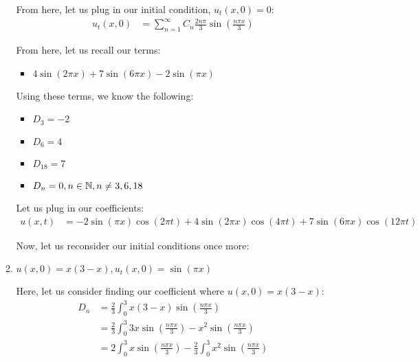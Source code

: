 \documentclass{article}
\begin{document}
\begin{enumerate}
\begin{enumerate}
     From here, let us plug in our initial condition, $u_t(x, 0) = 0$:
     \begin{align}
       u_t(x, 0) & =
       \sum^\infty_{n = 1}
       C_n
       \frac{2 n \pi}{3} \sin \left( \frac{n \pi x}{3} \right)
     \end{align}

     From here, let us recall our terms:
     \begin{itemize}
       \item $4 \sin(2 \pi x) + 7 \sin(6 \pi x) - 2\sin(\pi x)$
     \end{itemize}

     Using these terms, we know the following:
     \begin{itemize}
       \item $D_3 = -2$
       \item $D_6 = 4$
       \item $D_{18} = 7$
       \item $D_n = 0, n \in \mathbb N, n \neq 3, 6, 18$
     \end{itemize}


     Let us plug in our coefficients:
     \begin{align}
       u(x, t) & =
       - 2\sin(\pi x) \cos(2 \pi t)
       + 4\sin(2 \pi x) \cos(4 \pi t)
       + 7 \sin(6 \pi x) \cos(12 \pi t)
     \end{align}

     Now, let us reconsider our initial conditions once more:
     \setcounter{enumii}{4}
     \item $u(x, 0) = x(3 - x), u_t(x, 0) = \sin(\pi x)$

     Here, let us consider finding our coefficient where $u(x, 0) = x(3 - x)$:
     \begin{align}
       D_n & =
       \frac{2}{3} \int^3_0 x(3 - x) \sin\left(\frac{n \pi x}{3}\right)\\
       & =
       \frac{2}{3} \int^3_0 3x \sin\left(\frac{n \pi x}{3}\right) - x^2 \sin\left(\frac{n \pi x}{3}\right)\\
       & =
       2 \int^3_0 x \sin\left(\frac{n \pi x}{3}\right) -
       \frac{2}{3} \int^3_0  x^2 \sin\left(\frac{n \pi x}{3}\right)
     \end{align}


\end{enumerate}
\end{enumerate}
\end{document}
